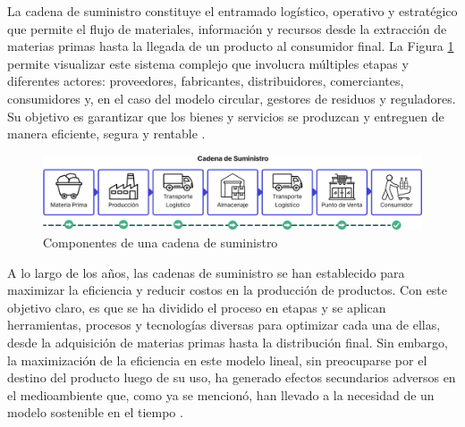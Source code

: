 La cadena de suministro constituye el entramado logístico, operativo y estratégico que permite el flujo de materiales, información y recursos desde la extracción de materias primas hasta la llegada de un producto al consumidor final. La Figura \ref{fig:supply-chain} permite visualizar este sistema complejo que involucra múltiples etapas y diferentes actores: proveedores, fabricantes, distribuidores, comerciantes, consumidores y, en el caso del modelo circular, gestores de residuos y reguladores. Su objetivo es garantizar que los bienes y servicios se produzcan y entreguen de manera eficiente, segura y rentable \cite{rodriguez2023modelamiento}.

\begin{figure}[!tb]
    \centering
    \includegraphics[width=\textwidth]{Figures/supply-chain.png}
    \caption{Componentes de una cadena de suministro}
    \label{fig:supply-chain}
\end{figure}

A lo largo de los años, las cadenas de suministro se han establecido para maximizar la eficiencia y reducir costos en la producción de productos. Con este objetivo claro, es que se ha dividido el proceso en etapas y se aplican herramientas, procesos y tecnologías diversas para optimizar cada una de ellas, desde la adquisición de materias primas hasta la distribución final. Sin embargo, la maximización de la eficiencia en este modelo lineal, sin preocuparse por el destino del producto luego de su uso, ha generado efectos secundarios adversos en el medioambiente que, como ya se mencionó, han llevado a la necesidad de un modelo sostenible en el tiempo \cite{espanacircular2030}.

